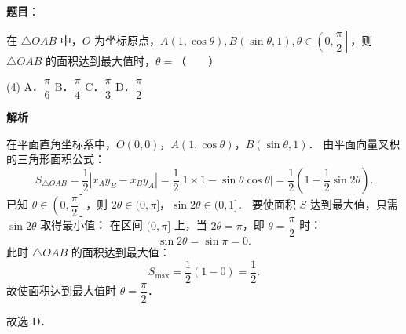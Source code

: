 \begin{answer}

\textbf{题目}：

在 $\triangle OAB$ 中，$O$ 为坐标原点，$A(1, \cos\theta), B(\sin\theta, 1), \theta \in \left(0, \dfrac{\pi}{2}\right]$，则 $\triangle OAB$ 的面积达到最大值时，$\theta =$\mbox{（　　）}

\begin{gkopts}(4)
\task A．$\dfrac{\pi}{6}$
\task B．$\dfrac{\pi}{4}$
\task C．$\dfrac{\pi}{3}$
\task D．$\dfrac{\pi}{2}$
\end{gkopts}

\textbf{解析}

在平面直角坐标系中，$O(0, 0)$，$A(1, \cos\theta)$，$B(\sin\theta, 1)$．
由平面向量叉积的三角形面积公式：
\nopagebreak[4]
\[
S_{\triangle OAB} = \dfrac{1}{2} |x_A y_B - x_B y_A| = \dfrac{1}{2} |1 \times 1 - \sin\theta\cos\theta| = \dfrac{1}{2} \left(1 - \dfrac{1}{2}\sin 2\theta\right).
\]
已知 $\theta \in \left(0, \dfrac{\pi}{2}\right]$，则 $2\theta \in (0, \pi]$，$\sin 2\theta \in (0, 1]$．
要使面积 $S$ 达到最大值，只需 $\sin 2\theta$ 取得最小值：
在区间 $(0, \pi]$ 上，当 $2\theta = \pi$，即 $\theta = \dfrac{\pi}{2}$ 时：
\nopagebreak[4]
\[
\sin 2\theta = \sin\pi = 0.
\]
此时 $\triangle OAB$ 的面积达到最大值：
\nopagebreak[4]
\[
S_{\max} = \dfrac{1}{2}(1 - 0) = \dfrac{1}{2}.
\]
故使面积达到最大值时 $\theta = \dfrac{\pi}{2}$．

故选 D．


\end{answer}
